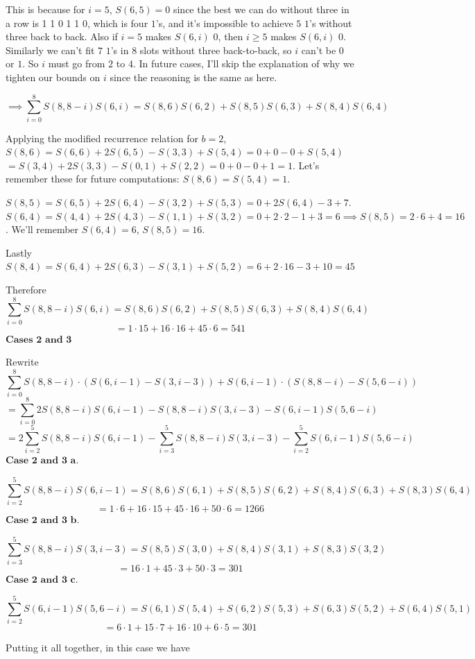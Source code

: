 \begin{enumerate}
 This is because for $i = 5$, $S(6,5) = 0$ since the best we can do without three in a row is 1 1 0 1 1 0, which is four $1$'s, and it's impossible to achieve $5$ $1$'s without three back to back. Also if $i=5$ makes $S(6,i)$ $0$, then $i \geq 5$ makes $S(6,i)$ $0$. Similarly we can't fit $7$ $1$'s in $8$ slots without three back-to-back, so $i$ can't be $0$ or $1$. So $i$ must go from $2$ to $4$. In future cases, I'll skip the explanation of why we tighten our bounds on $i$ since the reasoning is the same as here.

 
 \[\implies \sum_{i = 0}^{8} S(8,8-i)S(6,i) = S(8,6)S(6,2) + S(8,5)S(6,3) + S(8,4)S(6,4)\]

 Applying the modified recurrence relation for $b=2$, $S(8,6) = S(6,6) + 2S(6,5)-S(3,3)+S(5,4) = 0+0-0+S(5,4)$$= S(3,4)+2S(3,3)-S(0,1)+S(2,2) = 0+0-0+1 = 1$. Let's remember these for future computations: $S(8,6) = S(5,4) = 1$.

 $S(8,5) = S(6,5)+2S(6,4)-S(3,2)+S(5,3) = 0+2S(6,4)-3+7$. $S(6,4) = S(4,4) + 2S(4,3)-S(1,1)+S(3,2) = 0+2 \cdot 2 - 1 + 3 = 6 \implies S(8,5) = 2 \cdot 6 + 4 = 16$. We'll remember $S(6,4) = 6$, $S(8,5) = 16$.

 Lastly $S(8,4) = S(6,4) + 2S(6,3)-S(3,1)+S(5,2) = 6+2 \cdot 16 - 3 + 10 = 45$

 Therefore 
 \[\sum_{i = 0}^{8} S(8,8-i)S(6,i) = S(8,6)S(6,2) + S(8,5)S(6,3) + S(8,4)S(6,4)\]
 \[= 1 \cdot 15 + 16 \cdot 16 + 45 \cdot 6 = 541\]
$\textbf{Cases 2 and 3}$

 Rewrite 
 \[\sum_{i = 0}^{8} S(8,8-i) \cdot (S(6, i-1)-S(3, i-3)) + S(6, i-1) \cdot (S(8, 8-i)-S(5, 6-i))\]
 \[= \sum_{i = 0}^{8} 2S(8,8-i)S(6,i-1) - S(8,8-i)S(3,i-3) - S(6,i-1)S(5,6-i)\]
 \[= 2 \sum_{i=2}^{5} S(8,8-i)S(6,i-1) - \sum_{i=3}^{5} S(8,8-i)S(3,i-3) - \sum_{i=2}^{5} S(6,i-1)S(5,6-i)\]
$\textbf{Case 2 and 3 a.}$

 \[\sum_{i=2}^{5} S(8,8-i)S(6,i-1) = S(8,6)S(6,1) + S(8,5)S(6,2) + S(8,4)S(6,3) + S(8,3)S(6,4)\]
 \[= 1 \cdot 6 + 16 \cdot 15 + 45 \cdot 16 + 50 \cdot 6 = 1266\]
$\textbf{Case 2 and 3 b.}$

 \[\sum_{i=3}^{5} S(8,8-i)S(3,i-3) = S(8,5)S(3,0) + S(8,4)S(3,1)+S(8,3)S(3,2)\]
 \[= 16 \cdot 1 + 45 \cdot 3 + 50 \cdot 3 = 301\]
$\textbf{Case 2 and 3 c.}$

 \[\sum_{i=2}^{5} S(6,i-1)S(5,6-i) = S(6,1)S(5,4) + S(6,2)S(5,3) + S(6,3)S(5,2) + S(6,4)S(5,1)\]
 \[= 6 \cdot 1 + 15 \cdot 7 + 16 \cdot 10 + 6 \cdot 5 = 301\]

 Putting it all together, in this case we have


\end{enumerate}
